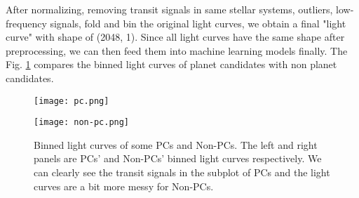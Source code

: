       After normalizing,
      removing transit signals in same stellar systems, outliers, low-frequency signals, 
      fold and bin the original light curves, we obtain a final "light curve" with  
      shape of (2048, 1). Since all light curves have the same shape after preprocessing,
      we can then feed them into machine learning models finally. The Fig. 
      \ref{fig: pc_non_pc} compares the binned light curves of planet candidates with non 
      planet candidates.

      \begin{figure}[!ht]  
        \begin{center}
        \begin{minipage}{0.45\textwidth}
          \begin{center} 
              \texttt{[image: pc.png]}
          \end{center}
        \end{minipage}
        \begin{minipage}{0.45\textwidth}
          \begin{center} 
              \texttt{[image: non-pc.png]}
          \end{center}
        \end{minipage}
      \end{center}
      \begin{center}
        \caption[Binned light curves of some PCs and Non-PCs.]
          {Binned light curves of some PCs and Non-PCs. The left and right panels 
          are PCs' and Non-PCs' binned light curves respectively.
          We can clearly see the transit signals in the subplot of PCs and the light 
          curves are a bit more messy for Non-PCs.}
        \label{fig: pc_non_pc}
        \end{center}
      \end{figure}
  

      
